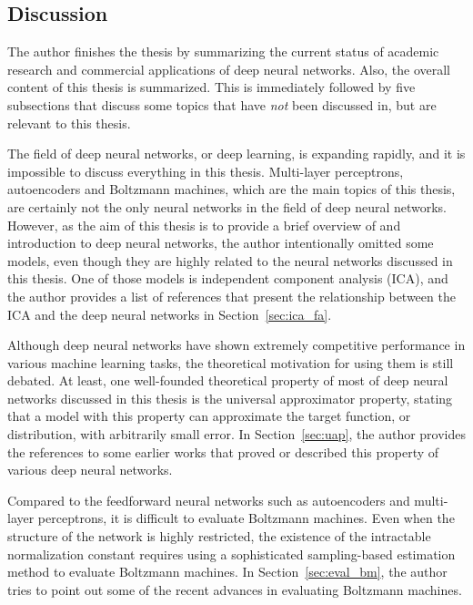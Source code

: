 \documentclass[dissertation,nocontribution,draft*]{aaltoseries}
\begin{document}
\subsection{Discussion}

The author finishes the thesis by summarizing the current
status of academic research and commercial applications of
deep neural networks. Also, the overall content of this
thesis is summarized. 
This is immediately followed by five subsections that
discuss some topics that have \textit{not} been discussed
in, but are relevant to this thesis.

The field of deep neural networks, or deep learning, is
expanding rapidly, and it is impossible to discuss
everything in this thesis. Multi-layer perceptrons,
autoencoders and  Boltzmann machines, which are the main topics
of this thesis, are certainly not the only neural networks
in the field of deep neural networks. However, as the aim of
this thesis is to provide a brief overview of and
introduction to deep neural networks, the author
intentionally omitted some models, even though they are
highly related to the neural networks discussed in this
thesis. One of those models is independent component
analysis (ICA), and the author provides a list of references
that present the relationship between the ICA and the deep
neural networks in Section~\ref{sec:ica_fa}.

Although deep neural networks have shown extremely
competitive performance in various machine learning tasks,
the theoretical motivation for using them is still debated.
At least, one well-founded theoretical property of most of
deep neural networks discussed in this thesis is the
universal approximator property, stating that a model with
this property can approximate the target function, or
distribution, with arbitrarily small error. In
Section~\ref{sec:uap}, the author provides the references to
some earlier works that proved or described this property of
various deep neural networks.

Compared to the feedforward neural networks such as
autoencoders and multi-layer perceptrons, it is difficult to
evaluate Boltzmann machines. Even when the structure of the
network is highly restricted, the existence of the
intractable normalization constant requires using a
sophisticated sampling-based estimation method to evaluate
Boltzmann machines. In Section~\ref{sec:eval_bm}, the author
tries to point out some of the recent advances in evaluating
Boltzmann machines.
\end{document}
